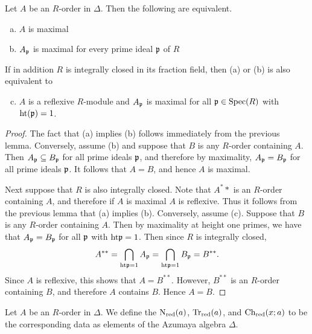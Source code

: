 \begin{cor}
Let $A$ be an $R$-order in $\Delta$.  Then the following are equivalent.
\begin{enumerate}[(a)]
\item  $A$ is maximal
\item  $A_{\mathfrak{p}}$ is maximal for every prime ideal $\mathfrak{p}$ of $R$
\end{enumerate}
If in addition $R$ is integrally closed in its fraction field, then (a) or (b) is also equivalent to
\begin{enumerate}[(a)]
\setcounter{enumi}{2}
\item  $A$ is a reflexive $R$-module and $A_{\mathfrak{p}}$ is maximal for all $\mathfrak{p}\in\textnormal{Spec}(R)$ with $\textnormal{ht}(\mathfrak{p})=1$.
\end{enumerate}
\end{cor}
\begin{proof}
The fact that (a) implies (b) follows immediately from the previous lemma.  Conversely, assume (b) and suppose that $B$ is any $R$-order containing $A$.  Then $A_{\mathfrak{p}}\subseteq B_{\mathfrak{p}}$ for all prime ideals $\mathfrak{p}$, and therefore by maximality, $A_{\mathfrak{p}} = B_{\mathfrak{p}}$ for all prime ideals $\mathfrak{p}$.  It follows that $A = B$, and hence $A$ is maximal.

Next suppose that $R$ is also integrally closed.  Note that $A^**$ is an $R$-order containing $A$, and therefore if $A$ is maximal $A$ is reflexive.  Thus it follows from the previous lemma that (a) implies (b).  Conversely, assume (c).  Suppose that $B$ is any $R$-order containing $A$.  Then by maximality at height one primes, we have that $A_{\mathfrak{p}} = B_{\mathfrak{p}}$ for all $\mathfrak{p}$ with $\textnormal{ht}\mathfrak{p} = 1$.  Then since $R$ is integrally closed,
$$A^{**} = \bigcap_{\textnormal{ht}\mathfrak{p} = 1} A_{\mathfrak{p}} = \bigcap_{\textnormal{ht}\mathfrak{p} = 1} B_{\mathfrak{p}} = B^{**}.$$
Since $A$ is reflexive, this shows that $A = B^{**}$.  However, $B^{**}$ is an $R$-order containing $B$, and therefore $A$ contains $B$.  Hence $A = B$.
\end{proof}

\begin{defn}
Let $A$ be an $R$-order in $\Delta$.  We define the  $\textnormal{N}_{\text{red}}(a)$,  $\textnormal{Tr}_{\text{red}}(a)$, and  $\textnormal{Ch}_{\text{red}}(x;a)$ to be the corresponding data as elements of the Azumaya algebra $\Delta$.
\end{defn}

